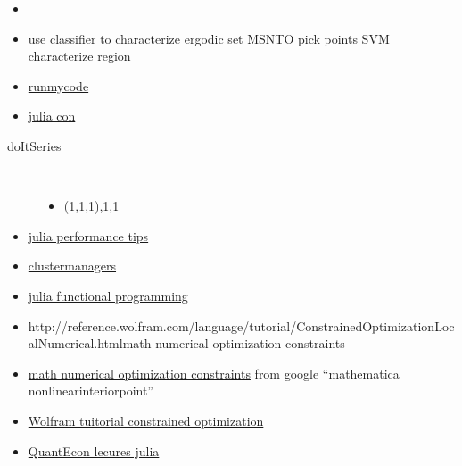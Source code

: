 \documentclass[hyperref]{labbook}
\begin{document}
\begin{itemize}
\item 
\end{itemize}

\begin{itemize}
\item use classifier to characterize ergodic set  MSNTO pick points SVM characterize region
\end{itemize}


\begin{itemize}
\item \href{http://www.runmycode.org/faq.html}{runmycode}
\item \href{http://juliacon.org/2018/cfp}{julia con}
\end{itemize}


\begin{description}
\item[doItSeries] \ 
  \begin{itemize}
  \item (1,1,1),1,1
  \end{itemize}
\end{description}


\begin{itemize}
\item \href{https://docs.julialang.org/en/stable/manual/performance-tips/}{julia performance tips}
\item \href{https://github.com/JuliaParallel/ClusterManagers.jl}{clustermanagers}
\item \href{https://groups.google.com/forum/?fromgroups=#!topic/julia-dev/21AGMrqbuM0}{julia functional programming}
\end{itemize}



\begin{itemize}
\item {http://reference.wolfram.com/language/tutorial/ConstrainedOptimizationLocalNumerical.html}{math numerical optimization constraints}
\item \href{http://reference.wolfram.com/language/tutorial/ConstrainedOptimizationLocalNumerical.html}{math numerical optimization constraints} from google ``mathematica nonlinearinteriorpoint''
\item \href{http://www.johnboccio.com/MathematicaTutorials/08_ConstrainedOptimization.pdf}{Wolfram tuitorial constrained optimization}
\item \href{https://lectures.quantecon.org/jl/}{QuantEcon lecures julia}
\end{itemize}
\end{document}
